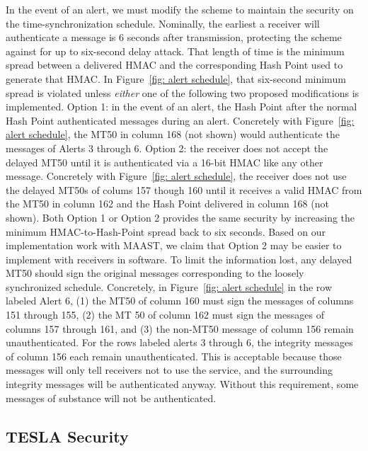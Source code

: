 \documentclass[letterpaper,times]{IONconf/IONconf}
\begin{document}
			In the event of an alert, we must modify the scheme to maintain the security on the time-synchronization schedule.
			Nominally, the earliest a receiver will authenticate a message is 6 seconds after transmission, protecting the scheme against for up to six-second delay attack.
			That length of time is the minimum spread between a delivered HMAC and the corresponding Hash Point used to generate that HMAC.
			In Figure~\ref{fig: alert schedule}, that six-second minimum spread is violated unless {\em either} one of the following two proposed modifications is implemented.
			Option 1: in the event of an alert, the Hash Point after the normal Hash Point authenticated messages during an alert. 
			Concretely with Figure~\ref{fig: alert schedule}, the MT50 in column 168 (not shown) would authenticate the messages of Alerts 3 through 6.
			Option 2: the receiver does not accept the delayed MT50 until it is authenticated via a 16-bit HMAC like any other message.
			Concretely with Figure~\ref{fig: alert schedule}, the receiver does not use the delayed MT50s of colums 157 though 160 until it receives a valid HMAC from the MT50 in column 162 and the Hash Point delivered in column 168 (not shown).
			Both Option 1 or Option 2 provides the same security by increasing the minimum HMAC-to-Hash-Point spread back to six seconds.
			Based on our implementation work with MAAST, we claim that Option 2 may be easier to implement with receivers in software.
			To limit the information lost, any delayed MT50 should sign the original messages corresponding to the loosely synchronized schedule.
			Concretely, in Figure~\ref{fig: alert schedule} in the row labeled Alert 6, (1) the MT50 of column 160 must sign the messages of columns 151 through 155, (2) the MT 50 of column 162 must sign the messages of columns 157 through 161, and (3) the non-MT50 message of column 156 remain unauthenticated.
			For the rows labeled alerts 3 through 6, the integrity messages of column 156 each remain unauthenticated.
			This is acceptable because those messages will only tell receivers not to use the service, and the surrounding integrity messages will be authenticated anyway.
			Without this requirement, some messages of substance will not be authenticated.

	\subsection{TESLA Security} \label{sub:tesla_security}
\end{document}
